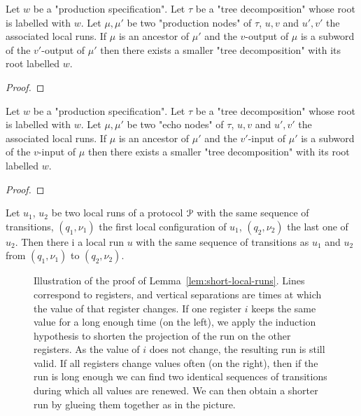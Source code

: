 \begin{lemma}
	Let $w$ be a "production specification".
	Let $\tau$ be a "tree decomposition" whose root is labelled with $w$.
	Let $\mu, \mu'$ be two "production nodes" of $\tau$, $u, v$ and $u', v'$ the associated local runs.
	If $\mu$ is an ancestor of $\mu'$ and the $v$-output of $\mu$ is a subword of the $v'$-output of $\mu'$ then there exists a smaller "tree decomposition" with its root labelled $w$.  
\end{lemma}

\begin{proof}
\end{proof}

\begin{lemma}
	Let $w$ be a "production specification".
	Let $\tau$ be a "tree decomposition" whose root is labelled with $w$.
	Let $\mu, \mu'$ be two "echo nodes" of $\tau$, $u, v$ and $u', v'$ the associated local runs.
	If $\mu$ is an ancestor of $\mu'$ and the $v'$-input of $\mu'$ is a subword of the $v$-input of $\mu$ then there exists a smaller "tree decomposition" with its root labelled $w$.  
\end{lemma}

\begin{proof}
\end{proof}

\begin{lemma}
	Let $u_1$, $u_2$ be two local runs of a protocol $\mathcal{P}$ with the same sequence of transitions, $(q_1, \nu_1)$ the first local configuration of $u_1$, $(q_2, \nu_2)$ the last one of $u_2$. Then there i a local run $u$ with the same sequence of transitions as $u_1$ and $u_2$ from $(q_1, \nu_1)$ to $(q_2, \nu_2)$. 
\end{lemma}

\begin{figure}
	
	\caption{Illustration of the proof of Lemma~\ref{lem:short-local-runs}. Lines correspond to registers, and vertical separations are times at which the value of that register changes. If one register $i$ keeps the same value for a long enough time (on the left), we apply the induction hypothesis to shorten the projection of the run on the other registers. As the value of $i$ does not change, the resulting run is still valid. If all registers change values often (on the right), then if the run is long enough we can find two identical sequences of transitions during which all values are renewed. We can then obtain a shorter run by glueing them together as in the picture.}
\end{figure}

